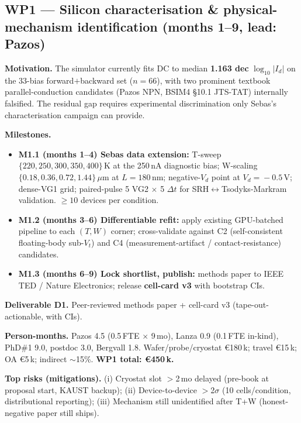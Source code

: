 \subsection{WP1 --- Silicon characterisation \& physical-mechanism
identification (months 1--9, lead: Pazos)}

\textbf{Motivation.} The simulator currently fits DC to median
\textbf{1.163 dec} $\log_{10}|I_d|$ on the 33-bias forward$+$backward
set ($n\!=\!66$), with two prominent textbook parallel-conduction
candidates (Pazos NPN, BSIM4 \S10.1 JTS-TAT) internally falsified. The
residual gap requires experimental discrimination only Sebas's
characterisation campaign can provide.

\textbf{Milestones.}
\begin{itemize}[leftmargin=1.4em, topsep=2pt, itemsep=1pt]
\item \textbf{M1.1 (months 1--4) Sebas data extension:} T-sweep
$\{220, 250, 300, 350, 400\}$\,K at the 250\,nA diagnostic bias;
W-scaling $\{0.18, 0.36, 0.72, 1.44\}\,\mu$m at $L\!=\!180$\,nm;
negative-$V_d$ point at $V_d\!=\!-0.5$\,V; dense-VG1 grid; paired-pulse
5 VG2 $\times$ 5 $\Delta t$ for SRH$\leftrightarrow$Tsodyks-Markram
validation. $\geq 10$ devices per condition.
\item \textbf{M1.2 (months 3--6) Differentiable refit:} apply existing
GPU-batched pipeline to each $(T, W)$ corner; cross-validate against C2
(self-consistent floating-body sub-$V_t$) and C4 (measurement-artifact /
contact-resistance) candidates.
\item \textbf{M1.3 (months 6--9) Lock shortlist, publish:} methods paper
to IEEE TED / Nature Electronics; release \textbf{cell-card v3} with
bootstrap CIs.
\end{itemize}

\textbf{Deliverable D1.} Peer-reviewed methods paper + cell-card v3
(tape-out-actionable, with CIs).

\textbf{Person-months.} Pazos 4.5 (0.5\,FTE $\times$ 9\,mo), Lanza 0.9
(0.1\,FTE in-kind), PhD\#1 9.0, postdoc 3.0, Bergvall 1.8.
Wafer/probe/cryostat \euro 180\,k; travel \euro 15\,k; OA \euro 5\,k;
indirect $\sim$15\%.  \textbf{WP1 total: \euro 450\,k.}

\textbf{Top risks (mitigations).} (i) Cryostat slot $>$2\,mo delayed
(pre-book at proposal start, KAUST backup); (ii) Device-to-device $>$2$\sigma$
(10 cells/condition, distributional reporting); (iii) Mechanism still
unidentified after T+W (honest-negative paper still ships).

